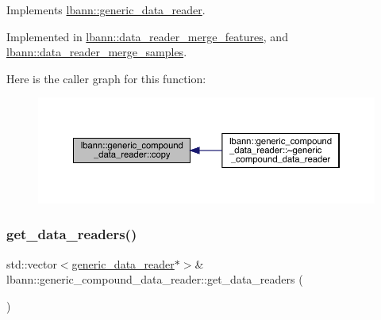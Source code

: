 Implements \hyperlink{classlbann_1_1generic__data__reader_a208ba1223e7aaa75e94b728501f12f86}{lbann\+::generic\+\_\+data\+\_\+reader}.



Implemented in \hyperlink{classlbann_1_1data__reader__merge__features_aa079ec1e03557e2c469f9da6e8aa45a8}{lbann\+::data\+\_\+reader\+\_\+merge\+\_\+features}, and \hyperlink{classlbann_1_1data__reader__merge__samples_ae22e720cfc9c6a196a04b7b65472618e}{lbann\+::data\+\_\+reader\+\_\+merge\+\_\+samples}.

Here is the caller graph for this function\+:\nopagebreak
\begin{figure}[H]
\begin{center}
\leavevmode
\includegraphics[width=350pt]{classlbann_1_1generic__compound__data__reader_a197f5fd06679f777a709453830fcc4f9_icgraph}
\end{center}
\end{figure}
\mbox{\label{classlbann_1_1generic__compound__data__reader_a3ba33e29527963baf182b2c034b8ba2d}} 
\subsubsection{\texorpdfstring{get\+\_\+data\+\_\+readers()}{get\_data\_readers()}}
{\footnotesize\ttfamily std\+::vector$<$\hyperlink{classlbann_1_1generic__data__reader}{generic\+\_\+data\+\_\+reader}$\ast$$>$\& lbann\+::generic\+\_\+compound\+\_\+data\+\_\+reader\+::get\+\_\+data\+\_\+readers (\begin{DoxyParamCaption}{ }\end{DoxyParamCaption})\hspace{0.3cm}{\ttfamily [inline]}}



